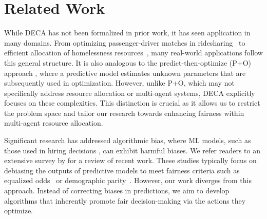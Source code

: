 \section{Related Work}
\label{sec:related}

While DECA has not been formalized in prior work, it has seen application in many domains. From optimizing passenger-driver matches in ridesharing~\citep{shah2020neural, qin2022RLforRides} to efficient allocation of homelessness resources~\citep{kube2019allocating, kube2023community}, many real-world applications follow this general structure. 
It is also analogous to the predict-then-optimize (P+O) approach \citep{wang2021PtO, elmachtoub2022smartPtO}, where a predictive model estimates unknown parameters that are subsequently used in optimization. However, unlike P+O, which may not specifically address resource allocation or multi-agent systems, DECA explicitly focuses on these complexities. This distinction is crucial as it allows us to restrict the problem space and tailor our research towards enhancing fairness within multi-agent resource allocation.

Significant research has addressed algorithmic bias, where ML models, such as those used in hiring decisions \citep{raghavan2020hiringbias}, can exhibit harmful biases. 
We refer readers to an extensive survey by \citet{mehrabi2021MLBiassurvey} for a review of recent work.
These studies typically focus on debiasing the outputs of predictive models to meet fairness criteria such as equalized odds~\citep{hardt2016equality} or demographic parity~\citep{DP_dwork2012}. However, our work diverges from this approach. Instead of correcting biases in predictions, we aim to develop algorithms that inherently promote fair decision-making via the actions they optimize.

